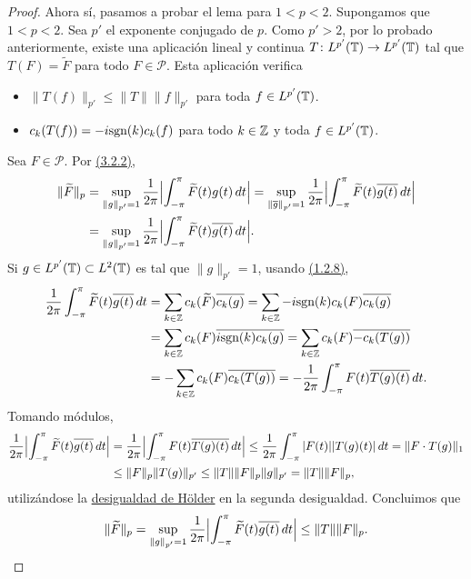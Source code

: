 \documentclass[a4paper, 12pt, oneside]{book}
\begin{document}
\begin{proof}
    Ahora sí, pasamos a probar el lema para $1 < p < 2$. Supongamos que $1<p<2$. Sea $p'$ el exponente conjugado de $p$. Como $p' > 2$, por lo probado anteriormente, existe una aplicación lineal y continua $T \colon L^{p'}(\mathbb T)\to L^{p'}(\mathbb T)$ tal que $T(F) = \widetilde{F}$ para todo $F \in \mathcal{P}$. Esta aplicación verifica
    \begin{itemize}
        \item $\|T(f)\|_{p'}\leq \|T\|\|f\|_{p'}$ para toda $f \in L^{p'}(\mathbb T)$.
        \item $c_k(T(f)) = -i\textup{sgn}(k)c_k(f)$ para todo $k\in\mathbb Z$ y toda $f \in L^{p'}(\mathbb T)$.
    \end{itemize}
    Sea $F \in \mathcal{P}$. Por \hyperref[3.2.2]{\color{blue}(3.2.2)},
    \[\begin{aligned}[t]
        \|\widetilde{F}\|_p &=  \sup_{\|g\|_{p'} = 1} \frac{1}{2\pi}\Bigl|\int_{-\pi}^{\pi} \widetilde{F}(t)g(t) \, dt\Bigr| = \sup_{\|\overline{g}\|_{p'} = 1} \frac{1}{2\pi}\Bigl|\int_{-\pi}^{\pi} \widetilde{F}(t)\overline{g(t)} \, dt\Bigr| \\
        &= \sup_{\|g\|_{p'} = 1} \frac{1}{2\pi}\Bigl|\int_{-\pi}^{\pi} \widetilde{F}(t)\overline{g(t)} \, dt\Bigr|.
    \end{aligned}\]
    Si $g \in L^{p'}(\mathbb T) \subset L^2(\mathbb T)$ es tal que $\|g\|_{p'} = 1$, usando \hyperref[1.2.8]{\color{blue}(1.2.8)},
    \begin{align*}
        \frac{1}{2\pi}\int_{-\pi}^{\pi} \widetilde{F}(t)\overline{g(t)} \, dt &= \sum_{k\in\mathbb Z} c_k(\widetilde{F})\overline{c_k(g)} = \sum_{k\in\mathbb Z} -i\textup{sgn}(k)c_k(F)\overline{c_k(g)} \\
        &= \sum_{k\in\mathbb Z}c_k(F)\overline{i\textup{sgn}(k)c_k(g)} = \sum_{k\in\mathbb Z}c_k(F)\overline{-c_k(T(g))} \\
        &= -\sum_{k\in\mathbb Z}c_k(F)\overline{c_k(T(g))} =-\frac{1}{2\pi}\int_{-\pi}^{\pi} F(t)\overline{T(g)(t)} \, dt.
    \end{align*}
    Tomando módulos,
    \begin{align*}
        \frac{1}{2\pi}\Bigl|\int_{-\pi}^{\pi} \widetilde{F}(t)\overline{g(t)} \, dt\Bigr| &= \frac{1}{2\pi}\Bigl|\int_{-\pi}^{\pi} F(t)\overline{T(g)(t)} \, dt\Bigr| \leq \frac{1}{2\pi}\int_{-\pi}^{\pi} |F(t)||T(g)(t)| \, dt = \|F \cdot T(g)\|_1 \\ 
        &\leq \|F\|_p\|T(g)\|_{p'} \leq \|T\|\|F\|_p\|g\|_{p'} = \|T\|\|F\|_p,
    \end{align*} 
    utilizándose la \hyperref[1.1.1]{\color{blue}desigualdad de Hölder} en la segunda desigualdad. Concluimos que
    \[\|\widetilde{F}\|_p = \sup_{\|g\|_{p'}=1}\frac{1}{2\pi}\Bigl|\int_{-\pi}^{\pi} \widetilde{F}(t)\overline{g(t)} \, dt\Bigr| \leq \|T\|\|F\|_p. \qedhere\]
\end{proof}
\end{document}
